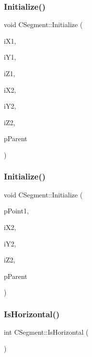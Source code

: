 \subsubsection{\texorpdfstring{Initialize()}{Initialize()}\hspace{0.1cm}{\footnotesize\ttfamily [2/3]}}
{\footnotesize\ttfamily void C\+Segment\+::\+Initialize (\begin{DoxyParamCaption}\item[{int}]{i\+X1,  }\item[{int}]{i\+Y1,  }\item[{int}]{i\+Z1,  }\item[{int}]{i\+X2,  }\item[{int}]{i\+Y2,  }\item[{int}]{i\+Z2,  }\item[{\mbox{\hyperlink{classCWire}{C\+Wire}} $\ast$}]{p\+Parent }\end{DoxyParamCaption})}

\mbox{\label{classCSegment_ade9b80c1a313a8a1b2d9969311ab8ce5}} 
\subsubsection{\texorpdfstring{Initialize()}{Initialize()}\hspace{0.1cm}{\footnotesize\ttfamily [3/3]}}
{\footnotesize\ttfamily void C\+Segment\+::\+Initialize (\begin{DoxyParamCaption}\item[{\mbox{\hyperlink{classCPoint}{C\+Point}} $\ast$}]{p\+Point1,  }\item[{int}]{i\+X2,  }\item[{int}]{i\+Y2,  }\item[{int}]{i\+Z2,  }\item[{\mbox{\hyperlink{classCWire}{C\+Wire}} $\ast$}]{p\+Parent }\end{DoxyParamCaption})\hspace{0.3cm}{\ttfamily [virtual]}}

\mbox{\label{classCSegment_a266ae5d5b2952937662d3b9a6164867c}} 
\subsubsection{\texorpdfstring{IsHorizontal()}{IsHorizontal()}}
{\footnotesize\ttfamily int C\+Segment\+::\+Is\+Horizontal (\begin{DoxyParamCaption}{ }\end{DoxyParamCaption})}

